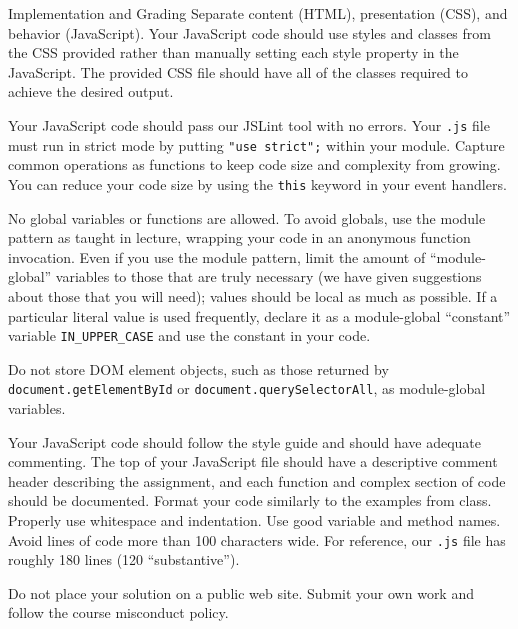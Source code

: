 \documentclass[programming]{../../../../mfcs}
\begin{document}
\begin{question}{Implementation and Grading}
Separate content (HTML), presentation (CSS), and behavior (JavaScript).
Your JavaScript code should use styles and classes from the CSS provided rather than manually
setting each style property in the JavaScript. The provided CSS file should have all of the classes required to
  achieve the desired output. 
\newline

Your JavaScript code should pass our JSLint tool with no errors. Your \texttt{.js} file must run in
  strict mode by putting \texttt{"use strict";} within your module.
Capture common operations as functions to keep code size and complexity from growing. You can reduce your code size by using the \texttt{this} keyword in your event handlers.
\newline

No global variables or functions are allowed. To avoid globals, use the module pattern as taught in lecture,
wrapping your code in an anonymous function invocation. Even if you use the module pattern, limit the amount of
  ``module-global'' variables to those that are truly necessary (we have given suggestions about
  those that you will need); values should be local as much as
  possible. If a particular
      literal value is used frequently, declare it as a module-global ``constant'' variable
      \texttt{IN\_UPPER\_CASE} and use the
constant in your code.
\newline

Do not store DOM element objects, such as those returned by
\texttt{document.getElementById} or \texttt{document.querySelectorAll}, as module-global variables. 
\newline

Your JavaScript code should follow the style guide and should have adequate commenting. The top of your
JavaScript file should have a descriptive
comment header describing the assignment, and each function and complex section of code should be documented.
Format your code similarly to the examples from class. Properly use whitespace and indentation. Use good
variable and method names. Avoid lines of code more than 100 characters wide. For reference, our \texttt{.js} file has
  roughly 180 lines (120 ``substantive'').
\newline

Do not place your solution on a public web site. Submit your own work and follow the course misconduct policy.
\end{question}
\end{document}
